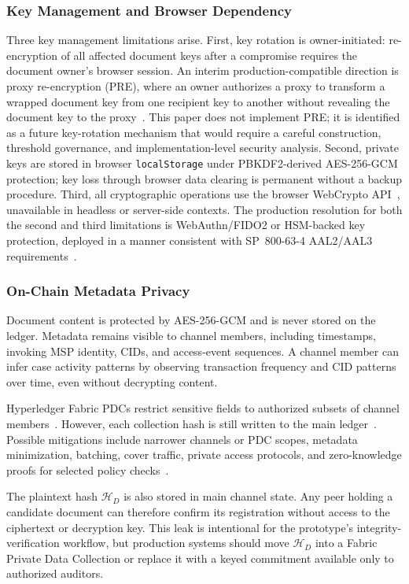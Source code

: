 \documentclass{ieeeaccess}
\begin{document}
\subsubsection{Key Management and Browser Dependency}
Three key management limitations arise. First, key rotation is
owner-initiated: re-encryption of all affected document keys after a
compromise requires the document owner's browser session. An interim
production-compatible direction is proxy re-encryption
(PRE), where an owner authorizes a proxy to transform a wrapped
document key from one recipient key to another without revealing the
document key to the proxy~\cite{ateniese2017redactable,nist80057,nist80053}.
This paper does not implement PRE; it is identified as a future
key-rotation mechanism that would require a careful construction,
threshold governance, and implementation-level security analysis. Second,
private keys are stored in browser \texttt{localStorage} under
PBKDF2-derived AES-256-GCM protection; key loss through browser data
clearing is permanent without a backup procedure. Third, all
cryptographic operations use the browser WebCrypto
API~\cite{w3cWebCrypto}, unavailable in headless or server-side
contexts. The production resolution for both the second and third
limitations is WebAuthn/FIDO2 or HSM-backed key protection, deployed
in a manner consistent with SP~800-63-4 AAL2/AAL3
requirements~\cite{nist800634,w3cWebAuthnL3,nist800131a,fips1403}.

\subsubsection{On-Chain Metadata Privacy}
Document content is protected by AES-256-GCM and is never stored on the
ledger. Metadata remains visible to channel members, including timestamps,
invoking MSP identity, CIDs, and access-event sequences. A channel member
can infer case activity patterns by observing transaction frequency and CID
patterns over time, even without decrypting content.

Hyperledger Fabric PDCs restrict sensitive fields to authorized subsets of
channel members~\cite{fabricPDCDoc,fabricChannelsDoc}. However, each
collection hash is still written to the main ledger~\cite{politou2019metadata}.
Possible mitigations include narrower channels or PDC scopes, metadata
minimization, batching, cover traffic, private access protocols, and
zero-knowledge proofs for selected policy checks~\cite{groth2016}.

The plaintext hash \(\mathcal{H}_D\) is also stored in main channel state.
Any peer holding a candidate document can therefore confirm its registration
without access to the ciphertext or decryption key. This leak is intentional
for the prototype's integrity-verification workflow, but production systems
should move \(\mathcal{H}_D\) into a Fabric Private Data Collection or
replace it with a keyed commitment available only to authorized auditors.
\end{document}
